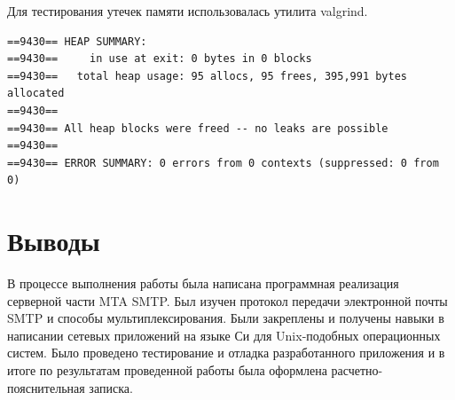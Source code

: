 \documentclass[a4paper,12pt]{report}
\begin{document}
Для тестирования утечек памяти использовалась утилита valgrind.
\begin{verbatim}
==9430== HEAP SUMMARY:
==9430==     in use at exit: 0 bytes in 0 blocks
==9430==   total heap usage: 95 allocs, 95 frees, 395,991 bytes allocated
==9430== 
==9430== All heap blocks were freed -- no leaks are possible
==9430== 
==9430== ERROR SUMMARY: 0 errors from 0 contexts (suppressed: 0 from 0)

\end{verbatim}


\chapter*{Выводы}

В процессе выполнения работы была написана программная реализация серверной части MTA SMTP. Был изучен протокол передачи электронной почты SMTP и способы мультиплексирования. Были закреплены и получены навыки в написании сетевых приложений на языке Си для Unix-подобных операционных систем. Было проведено тестирование и отладка разработанного приложения и в итоге по результатам проведенной работы была оформлена расчетно-пояснительная записка.
\end{document}
